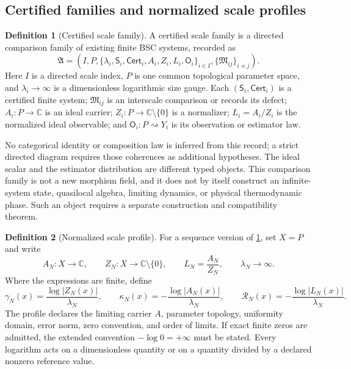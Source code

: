 \documentclass[11pt,a4paper]{article}
\theoremstyle{definition}
\newtheorem{definition}{Definition}[section]
\theoremstyle{plain}
\theoremstyle{remark}
\newcommand{\Cert}{\mathsf{Cert}}
\begin{document}
\subsection{Certified families and normalized scale profiles}

\begin{definition}[Certified scale family]\label{def:certscalefamily}
A certified scale family is a directed comparison family of existing finite BSC
systems, recorded as
\[
\mathfrak A=
\left(
I,P,\{\lambda_i,\mathsf S_i,\Cert_i,A_i,Z_i,L_i,\mathsf O_i\}_{i\in I},
\{\mathfrak M_{ij}\}_{i\preceq j}
\right).
\]
Here \(I\) is a directed scale index, \(P\) is one common topological
parameter space, and \(\lambda_i\to\infty\) is a dimensionless logarithmic
size gauge.  Each \((\mathsf S_i,\Cert_i)\) is a certified finite system;
\(\mathfrak M_{ij}\) is an interscale comparison or records its defect;
\(A_i:P\to\mathbb C\) is an ideal carrier;
\(Z_i:P\to\mathbb C\setminus\{0\}\) is a normalizer;
\(L_i=A_i/Z_i\) is the normalized ideal observable; and
\(\mathsf O_i:P\rightsquigarrow Y_i\) is its observation or estimator law.
\end{definition}

No categorical identity or composition law is inferred from this record; a
strict directed diagram requires those coherences as additional hypotheses.
The ideal scalar and the estimator distribution are different typed objects.
This comparison family is not a new morphism field, and it does not by itself construct
an infinite-system state, quasilocal algebra, limiting dynamics, or physical
thermodynamic phase.  Such an object requires a separate construction and
compatibility theorem.

\begin{definition}[Normalized scale profile]\label{def:normscaleprofile}
For a sequence version of \cref{def:certscalefamily}, set \(X=P\) and write
\[
 A_N:X\to\mathbb C,\qquad
 Z_N:X\to\mathbb C\setminus\{0\},\qquad
 L_N=\frac{A_N}{Z_N},\qquad \lambda_N\longrightarrow\infty .
\]
Where the expressions are finite, define
\[
 \gamma_N(x)=\frac{\log|Z_N(x)|}{\lambda_N},\qquad
 \kappa_N(x)=-\frac{\log|A_N(x)|}{\lambda_N},\qquad
 \mathcal R_N(x)=-\frac{\log|L_N(x)|}{\lambda_N}.
\]
The profile declares the limiting carrier \(A\), parameter topology,
uniformity domain, error norm, zero convention, and order of limits.  If exact
finite zeros are admitted, the extended convention
\(-\log0=+\infty\) must be stated.  Every logarithm acts on a dimensionless
quantity or on a quantity divided by a declared nonzero reference value.
\end{definition}
\end{document}

